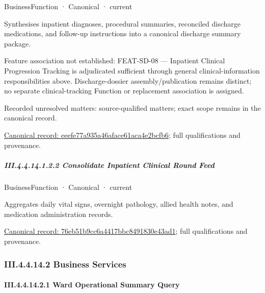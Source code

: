 \label{element:eeefe77a935a46aface61aca4e2bcfb6}
{\small BusinessFunction · Canonical · current}\par

Synthesises inpatient diagnoses, procedural summaries, reconciled discharge medications, and follow-up instructions into a canonical discharge summary package.



Feature association not established: FEAT-SD-08 — Inpatient Clinical Progression Tracking is adjudicated sufficient through general clinical-information responsibilities above. Discharge-dossier assembly/publication remains distinct; no separate clinical-tracking Function or replacement association is assigned.


{\small Recorded unresolved matters: source-qualified matters; exact scope remains in the canonical record.}\par
{\footnotesize \href{../../../../../../../continuum/business/business-function/eeefe77a935a46aface61aca4e2bcfb6.md}{Canonical record: eeefe77a935a46aface61aca4e2bcfb6}; full qualifications and provenance.}\par
\subparagraph*{III.4.4.14.1.2.2 Consolidate Inpatient Clinical Round Feed}
\label{navigation:III.4.4.14.1.2.2}

\label{element:76eb51b9cc6a4417bbc8491830e43ad1}
{\small BusinessFunction · Canonical · current}\par

Aggregates daily vital signs, overnight pathology, allied health notes, and medication administration records.


{\footnotesize \href{../../../../../../../continuum/business/business-function/76eb51b9cc6a4417bbc8491830e43ad1.md}{Canonical record: 76eb51b9cc6a4417bbc8491830e43ad1}; full qualifications and provenance.}\par
\subsubsection*{III.4.4.14.2 Business Services}
\label{navigation:III.4.4.14.2}

\paragraph*{III.4.4.14.2.1 Ward Operational Summary Query}
\label{navigation:III.4.4.14.2.1}

